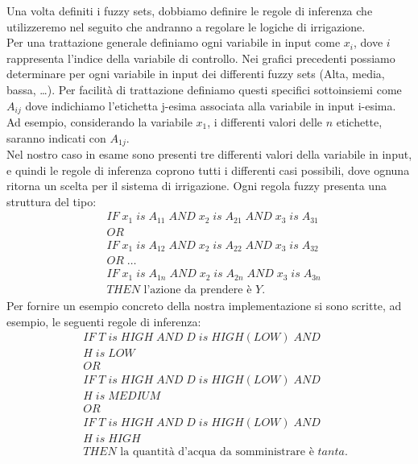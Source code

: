 \documentclass[conference,10pt]{IEEEtran}
\begin{document}
Una volta definiti i fuzzy sets, dobbiamo definire le regole di inferenza che utilizzeremo nel seguito che andranno a regolare le logiche di irrigazione.\\
Per una trattazione generale definiamo ogni variabile in input come $x_i$, dove $i$ rappresenta l'indice della variabile di controllo.
Nei grafici precedenti possiamo determinare per ogni variabile in input dei differenti fuzzy sets (Alta, media, bassa, \dots). Per facilità di trattazione definiamo questi specifici sottoinsiemi come $A_{ij}$ dove indichiamo l'etichetta j-esima associata alla variabile in input i-esima. Ad esempio, considerando la variabile $x_1$, i differenti valori delle $n$ etichette, saranno indicati con $A_{1j}$.\\
Nel nostro caso in esame sono presenti tre differenti valori della variabile in input, e quindi le regole di inferenza coprono tutti i differenti casi possibili, dove ognuna ritorna un scelta per il sistema di irrigazione.
Ogni regola fuzzy presenta una struttura del tipo:\\
\begin{equation*}
\begin{split}
&IF\;x_1\;is\;A_{11}\;AND\;x_2\;is\;A_{21}\;AND\;x_3\;is\;A_{31}\\
&OR \\
&IF\;x_1\;is\;A_{12}\;AND\;x_2\;is\;A_{22}\;AND\;x_3\;is\;A_{32}\\
&OR\;\dots\\
&IF\;x_1\;is\;A_{1n}\;AND\;x_2\;is\;A_{2n}\;AND\;x_3\;is\;A_{3n}\\
&THEN\text{ l'azione da prendere è }Y.
\end{split}
\end{equation*}
Per fornire un esempio concreto della nostra implementazione si sono scritte, ad esempio, le seguenti regole di inferenza:\\
\begin{equation*}
\begin{split}
&IF\;T\;is\;HIGH\;AND\;D\;is\;HIGH(LOW)\;AND\\\;&H\;is\;LOW\\
&OR \\
&IF\;T\;is\;HIGH\;AND\;D\;is\;HIGH(LOW)\;AND\\\;&H\;is\;MEDIUM\\
&OR\;\\
&IF\;T\;is\;HIGH\;AND\;D\;is\;HIGH(LOW)\;AND\\\;&H\;is\;HIGH\\
&THEN\text{ la quantità d'acqua da somministrare è }tanta.
\end{split}
\end{equation*}
\end{document}
